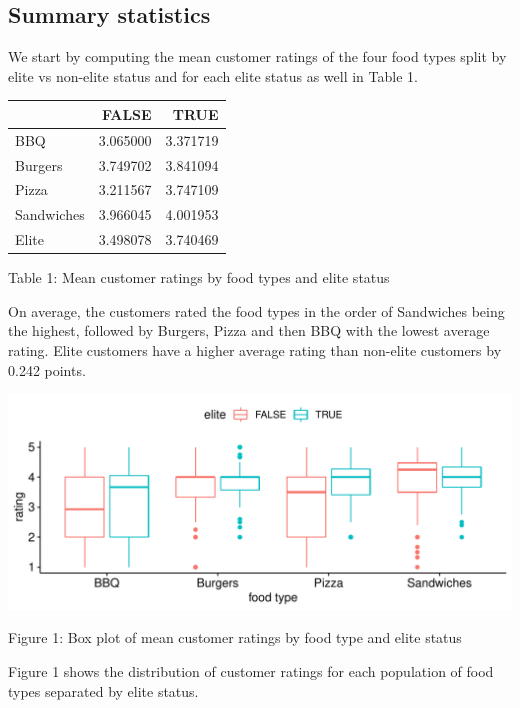 \documentclass[
]{article}
\begin{document}
\subsection{Summary statistics}

We start by computing the mean customer ratings of the four food types
split by elite vs non-elite status and for each elite status as well in
Table 1. \newpage

\begin{longtable}[]{@{}lrr@{}}
\toprule()
& FALSE & TRUE \\
\midrule()
\endhead
BBQ & 3.065000 & 3.371719 \\
Burgers & 3.749702 & 3.841094 \\
Pizza & 3.211567 & 3.747109 \\
Sandwiches & 3.966045 & 4.001953 \\
Elite & 3.498078 & 3.740469 \\
\bottomrule()
\end{longtable}

\begin{center}  
Table 1: Mean customer ratings by food types and elite status  
\end{center}

On average, the customers rated the food types in the order of
Sandwiches being the highest, followed by Burgers, Pizza and then BBQ
with the lowest average rating. Elite customers have a higher average
rating than non-elite customers by 0.242 points.

\includegraphics{customer_ratings_analysis_files/figure-latex/unnamed-chunk-3-1.pdf}

\begin{center}  
Figure 1: Box plot of mean customer ratings by food type and elite status
\end{center}

Figure 1 shows the distribution of customer ratings for each population
of food types separated by elite status.
\end{document}
